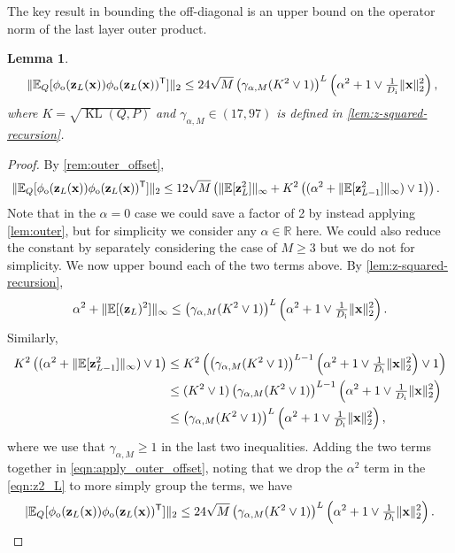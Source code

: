 \documentclass[twoside]{article}
\renewcommand{\ss}[1]{_{\text{#1}}}
\newcommand{\vx}{\mathbf{x}}
\newcommand{\vz}{\mathbf{z}}
\newcommand{\E}{\mathbb{E}}
\renewcommand{\P}{\mathbb{P}}
\newcommand{\Q}{\mathbb{Q}}
\renewcommand{\Q}{\ensuremath{Q}}
\renewcommand{\P}{\ensuremath{P}}
\newcommand{\T}{\text{\textsf{T}}}
\newcommand{\KL}{\operatorname{KL}}
\renewcommand{\ss}[1]{_{\text{#1}}}        %
\DeclarePairedDelimiter\norm{\|}{\|}             %
\theoremstyle{theoremstyle}
\newtheorem{lemma}[theorem]{Lemma}
\begin{document}
The key result in bounding the off-diagonal is an upper bound on the operator norm of the last layer outer product.
\begin{lemma}\label{lem:offdiag-operator-norm}
\begin{equation}
    \  \|\E_{\Q}[\phi\ss{o}(\vz_{L}(\vx))\phi\ss{o}(\vz_{L}(\vx))^\T]\|_2 
    \leq 24\sqrt{M} \left(\gamma_{\alpha,M}(K^2 \lor 1)\right)^{L}\left(\alpha^2 + 1\lor \tfrac1{D\ss{i}}\|\vx\|^2_2\right),
\end{equation}
where $K=\sqrt{\KL(\Q,\P)}$ and $\gamma_{\alpha,M} \in (17,97)$ is defined in \cref{lem:z-squared-recursion}.
\end{lemma}
\begin{proof}
By \cref{rem:outer_offset}, 
\begin{align}
      \  \|\E_{\Q}[\phi\ss{o}(\vz_{L}(\vx))\phi\ss{o}(\vz_{L}(\vx))^\T]\|_2 &\leq  12\sqrt{M}\left(
                \norm{\E[\vz_L^2]}_\infty
                + K^2 \left((\alpha^2 + \norm{\E[\vz_{L-1}^2]}_\infty) \lor 1 \right) \right). \label{eqn:apply_outer_offset}
\end{align}
Note that in the $\alpha=0$ case we could save a factor of 2 by instead applying \cref{lem:outer}, but for simplicity we consider any $\alpha\in\mathbb{R}$ here. We could also reduce the constant by separately considering the case of $M \ge 3$ but we do not for simplicity. 
We now upper bound each of the two terms above. By \cref{lem:z-squared-recursion},
\begin{equation}
    \alpha^2 + \norm{\E[(\vz_L)^2]}_\infty \leq \left(\gamma_{\alpha,M}(K^2 \lor 1)\right)^{L}\left(\alpha^2 + 1\lor \tfrac1{D\ss{i}}\|\vx\|^2_2\right). \label{eqn:z2_L}
\end{equation}
Similarly,
\begin{align}
    K^2 \left((\alpha^2 + \norm{\E[\vz_{L-1}^2]}_\infty) \lor 1 \right)
    &\leq K^2 \left(\left(\gamma_{\alpha,M}(K^2 \lor 1)\right)^{L-1}\left(\alpha^2 + 1\lor \tfrac1{D\ss{i}}\|\vx\|^2_2\right) \lor 1\right) \\
    &\leq (K^2 \lor 1) \left(\gamma_{\alpha,M}(K^2 \lor 1)\right)^{L-1}\left(\alpha^2 + 1\lor \tfrac1{D\ss{i}}\|\vx\|^2_2\right) \\
    &\leq \left(\gamma_{\alpha,M}(K^2 \lor 1)\right)^{L}\left(\alpha^2 + 1\lor \tfrac1{D\ss{i}}\|\vx\|^2_2\right),
\end{align}
where we use that $\gamma_{\alpha,M}\ge1$ in the last two inequalities. Adding the two terms together in \cref{eqn:apply_outer_offset}, noting that we drop the $\alpha^2$ term in the \cref{eqn:z2_L} to more simply group the terms, we have
\begin{equation}
    \\|\E_{\Q}[\phi\ss{o}(\vz_{L}(\vx))\phi\ss{o}(\vz_{L}(\vx))^\T]\|_2 
    \leq 24\sqrt{M} \left(\gamma_{\alpha,M} (K^2 \lor 1)\right)^{L}\left(\alpha^2 + 1\lor \tfrac1{D\ss{i}}\|\vx\|^2_2\right).
\end{equation}

\end{proof}
\end{document}
